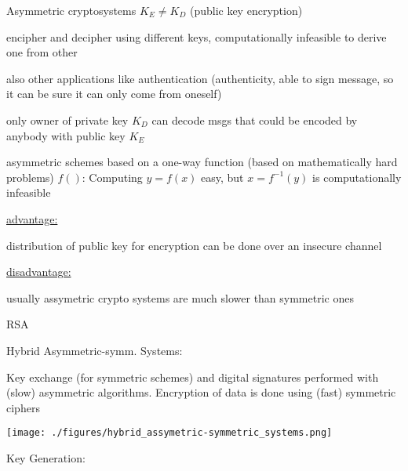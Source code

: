 \documentclass[landscape, a4paper]{article}
\begin{document}
\begin{minipage}[t]{0.198\pagewidth}
	\begin{betterlist}
		\item \alert{Asymmetric cryptosystems} $K_E \ne K_D$ (public key encryption)
		\begin{betterlist}
			\item encipher and decipher using different keys, computationally infeasible to derive one from other
			\item also other applications like \alert{authentication} (authenticity, able to sign message, so it can be sure it can only come from oneself)
			\item only owner of \alert{private key} $K_D$ can decode msgs that could be encoded by anybody with \alert{public key} $K_E$
			\item asymmetric schemes based on a \alert{one-way function} (based on mathematically hard problems) $f()$: Computing $y = f(x)$ easy, but $x = f^{-1}(y)$ is computationally infeasible
			\item \underline{advantage:}
			\begin{betterlist}
				\item distribution of public key for encryption can be done over an insecure channel
			\end{betterlist}
			\item \underline{disadvantage:}
			\begin{betterlist}
				\item usually assymetric crypto systems are much slower than symmetric ones
			\end{betterlist}
			\item \alert{RSA}
		\end{betterlist}
		\item \alert{Hybrid Asymmetric-symm. Systems:}
		\begin{betterlist}
			\item Key exchange (for symmetric schemes) and digital signatures performed with (slow) asymmetric algorithms. Encryption of data is done using (fast) symmetric ciphers
		\end{betterlist}
		\texttt{[image: ./figures/hybrid\_assymetric-symmetric\_systems.png]}
	\end{betterlist}
	\fbox{RSA}
	\begin{betterlist}
		\item \alert{Key Generation:}

\end{betterlist}
\end{minipage}
\end{document}
